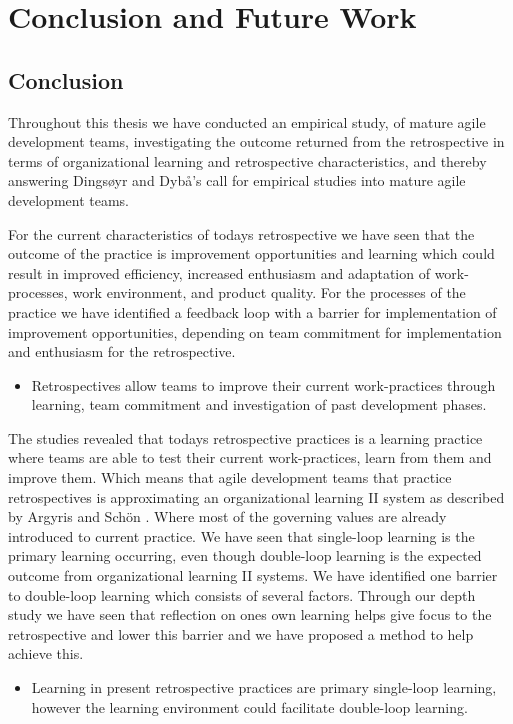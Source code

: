 \chapter{Conclusion and Future Work}
\section{Conclusion}
Throughout this thesis we have conducted an empirical study, of mature agile development teams, investigating the outcome returned from the retrospective in terms of organizational learning and retrospective characteristics, and thereby answering Dingsøyr and Dybå’s call \cite{Dyba2008} for empirical studies into mature agile development teams.

For the current characteristics of todays retrospective we have seen that the outcome of the practice is improvement opportunities and learning which could result in improved efficiency, increased enthusiasm and adaptation of work-processes, work environment, and product quality. For the processes of the practice we have identified a feedback loop with a barrier for implementation of improvement opportunities, depending on team commitment for implementation and enthusiasm for the retrospective. 

\begin{itemize}
\item Retrospectives allow teams to improve their current work-practices through learning, team commitment and investigation of past development phases.
\end{itemize}

The studies revealed that todays retrospective practices is a learning practice where teams are able to test their current work-practices, learn from them and improve them. Which means that agile development teams that practice retrospectives is approximating an organizational learning II system as described by Argyris and Schön \cite{Argyris1996}. Where most of the governing values are already introduced to current practice. We have seen that single-loop learning is the primary learning occurring, even though double-loop learning is the expected outcome from organizational learning II systems. We have identified one barrier to double-loop learning which consists of several factors. Through our depth study we have seen that reflection on ones own learning helps give focus to the retrospective and lower this barrier and we have proposed a method to help achieve this. 

\begin{itemize}
\item Learning in present retrospective practices are primary single-loop learning, however the learning environment could facilitate double-loop learning.
\end{itemize}

